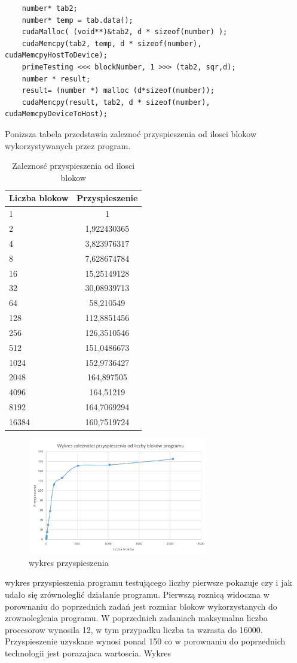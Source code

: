 \documentclass[a4paper,12pt]{article}
\begin{document}
\begin{lstlisting}
    number* tab2;               
    number* temp = tab.data();         
    cudaMalloc( (void**)&tab2, d * sizeof(number) );                     
    cudaMemcpy(tab2, temp, d * sizeof(number), cudaMemcpyHostToDevice);  
    primeTesting <<< blockNumber, 1 >>> (tab2, sqr,d);                    
    number * result;                                                            
    result= (number *) malloc (d*sizeof(number));                               
    cudaMemcpy(result, tab2, d * sizeof(number), cudaMemcpyDeviceToHost);       
\end{lstlisting}

Ponizsza tabela przedstawia zaleznoć przyspieszenia od ilosci blokow wykorzystywanych przez program.
\begin{table}[!hbp]
\centering
\begin{tabular}{|p{5cm}|c|}
\hline 
Liczba blokow & Przyspieszenie \tabularnewline
\hline 
1	& 1\tabularnewline
2	& 1,922430365\tabularnewline
4	& 3,823976317\tabularnewline
8	& 7,628674784\tabularnewline
16 &	15,25149128\tabularnewline
32 &	30,08939713\tabularnewline
64 &	58,210549\tabularnewline
128 &	112,8851456\tabularnewline
256 &	126,3510546\tabularnewline
512 &	151,0486673\tabularnewline
1024 &	152,9736427\tabularnewline
2048 &	164,897505\tabularnewline
4096 &	164,51219\tabularnewline
8192 &	164,7069294\tabularnewline
16384	& 160,7519724\tabularnewline
\hline
\end{tabular}
\caption{Zaleznosć przyspieszenia od ilosci blokow}
\end{table}



\begin{figure}[!hbp]
	\centering
  \includegraphics[width=0.7\textwidth]{wykres.png}
  \caption{wykres przyspieszenia}
\end{figure}
wykres przyspieszenia programu testującego liczby pierwsze pokazuje czy i jak udało się zrównoleglić działanie programu. Pierwszą roznicą widoczna w porownaniu do poprzednich zadań jest rozmiar blokow wykorzystanych do zrownoleglenia programu. W poprzednich zadaniach maksymalna liczba procesorow wynosila 12, w tym przypadku liczba ta wzrasta do 16000. Przyspieszenie uzyskane wynosi ponad 150 co w porownaniu do poprzednich technologii jest porazajaca wartoscia. Wykres
 
\end{document}

